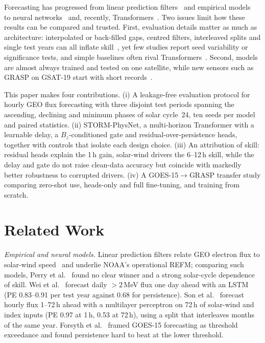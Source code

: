 \documentclass[conference,a4paper]{IEEEtran}
\begin{document}
Forecasting has progressed from linear prediction filters~\cite{baker1990}
and empirical models~\cite{perry2010} to neural
networks~\cite{wei2018,son2022} and, recently,
Transformers~\cite{tan2024,sun2024,sun2025}. Two issues limit how these
results can be compared and trusted. First, evaluation details matter as much
as architecture: interpolated or back-filled gaps, centred filters, interleaved
splits and single test years can all inflate skill~\cite{camporeale2019,kapoor2023},
yet few studies report seed variability or significance tests, and simple
baselines often rival Transformers~\cite{zeng2023,tan2024}. Second, models are
almost always trained and tested on one satellite, while new sensors such as
GRASP on GSAT-19 start with short records~\cite{zhao2025}.

This paper makes four contributions. (i) A leakage-free evaluation protocol
for hourly GEO flux forecasting with three disjoint test periods spanning the
ascending, declining and minimum phases of solar cycle~24, ten seeds per model
and paired statistics. (ii) STORM-PhysNet, a multi-horizon Transformer with a
learnable delay, a \(B_z\)-conditioned gate and residual-over-persistence heads,
together with controls that isolate each design choice. (iii) An attribution of
skill: residual heads explain the 1\,h gain, solar-wind drivers the 6--12\,h
skill, while the delay and gate do not raise clean-data accuracy but coincide
with markedly better robustness to corrupted drivers. (iv) A GOES-15\(\to\)GRASP
transfer study comparing zero-shot use, heads-only and full fine-tuning, and
training from scratch.

\section{Related Work}
\textit{Empirical and neural models.} Linear prediction filters relate GEO
electron flux to solar-wind speed~\cite{baker1990} and underlie NOAA's
operational REFM; comparing such models, Perry et al.~\cite{perry2010} found no
clear winner and a strong solar-cycle dependence of skill. Wei et al.~\cite{wei2018}
forecast daily \({>}2\)\,MeV flux one day ahead with an LSTM (PE 0.83--0.91 per
test year against 0.68 for persistence). Son et al.~\cite{son2022} forecast hourly
flux 1--72\,h ahead with a multilayer perceptron on 72\,h of solar-wind and index
inputs (PE 0.97 at 1\,h, 0.53 at 72\,h), using a split that interleaves months
of the same year. Forsyth et al.~\cite{forsyth2020} framed GOES-15 forecasting as
threshold exceedance and found persistence hard to beat at the lower threshold.
\end{document}
